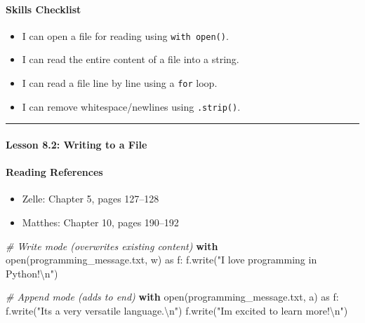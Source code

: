 \documentclass[
  justified,
  openright,
]{tufte-book}
\let\subsection\paragraph
\let\paragraph\paragraph
\newcommand{\KeywordTok}[1]{\textcolor{CodeKeyword}{\textbf{#1}}}  %
\newcommand{\StringTok}[1]{\textcolor{CodeString}{#1}}              %
\newcommand{\CommentTok}[1]{\textcolor{CodeComment}{\textit{#1}}}  %
\newcommand{\CodeAccentTok}[1]{\textcolor{CodeAccent}{#1}}          %
\newenvironment{Shaded}{%
  \begin{mdframed}[style=TufteCode]%
}{%
  \end{mdframed}%
}
\let\subsection\paragraph
\let\paragraph\paragraph
\providecommand{\tightlist}{%
  \setlength{\itemsep}{0pt}\setlength{\parskip}{0pt}}
\begin{document}
\subsection{Skills Checklist}\label{skills-checklist-37}

\begin{itemize}
\tightlist
\item[$\square$]
  I can open a file for reading using \texttt{with\ open()}.
\item[$\square$]
  I can read the entire content of a file into a string.
\item[$\square$]
  I can read a file line by line using a \texttt{for} loop.
\item[$\square$]
  I can remove whitespace/newlines using \texttt{.strip()}.
\end{itemize}

\begin{center}\rule{0.5\linewidth}{0.5pt}\end{center}

\subsection{Lesson 8.2: Writing to a
File}\label{lesson-8.2-writing-to-a-file}

\subsection{Reading References}\label{reading-references-24}

\begin{itemize}
\tightlist
\item
  Zelle: Chapter 5, pages 127--128
\item
  Matthes: Chapter 10, pages 190--192
\end{itemize}

\begin{Shaded}
\begin{Highlighting}[]
\CommentTok{\# Write mode (overwrites existing content)}
\KeywordTok{with} open(\StringTok{\textquotesingle{}programming\_message.txt\textquotesingle{}}, \StringTok{\textquotesingle{}w\textquotesingle{}}) \CodeAccentTok{as} f:
    f.write(\StringTok{"I love programming in Python!}\StringTok{\textbackslash{}n}\StringTok{"})
 
\CommentTok{\# Append mode (adds to end)}
\KeywordTok{with} open(\StringTok{\textquotesingle{}programming\_message.txt\textquotesingle{}}, \StringTok{\textquotesingle{}a\textquotesingle{}}) \CodeAccentTok{as} f:
    f.write(\StringTok{"It\textquotesingle{}s a very versatile language.}\StringTok{\textbackslash{}n}\StringTok{"})
    f.write(\StringTok{"I\textquotesingle{}m excited to learn more!}\StringTok{\textbackslash{}n}\StringTok{"})
\end{Highlighting}
\end{Shaded}
\end{document}
